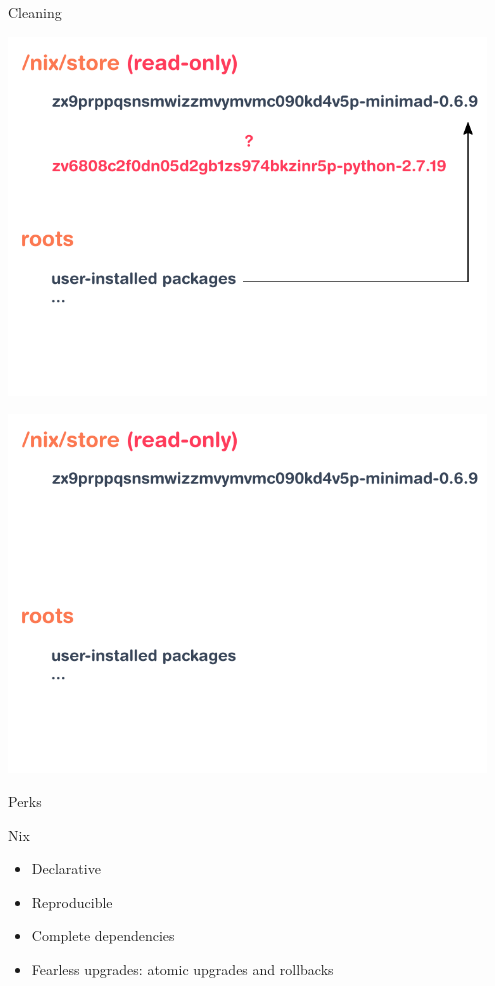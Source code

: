 \documentclass[t, aspectratio=169]{beamer}
\begin{document}
\begin{frame}{Cleaning}
{\begin{center}
        \end{center}
    }
     {
        \begin{center}
            \includegraphics[width=0.95\textwidth]{img/schema-nix-store-gc-3.pdf}
        \end{center}
    }
     {
        \begin{center}
            \includegraphics[width=0.95\textwidth]{img/schema-nix-store-gc-4.pdf}
        \end{center}
    }
\end{frame}

\begin{frame}{Perks}
    \begin{block}{Nix}
        \begin{itemize}
            \item Declarative
            \item Reproducible
            \item Complete dependencies
            \item Fearless upgrades: atomic upgrades and rollbacks
        \end{itemize}
    \end{block}
\end{frame}
\end{document}

